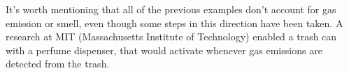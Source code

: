 It's worth mentioning that all of the previous examples don't account for gas emission or smell, even though some steps in this direction have been taken.
A research at MIT (Massachusetts Institute of Technology) enabled a trash can with a perfume dispenser, that would activate whenever gas emissions are detected from the trash\cite{perfume}.


